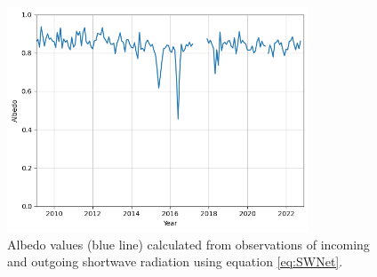 \documentclass{article}
\begin{document}
\begin{figure}[h!]
  \centering
  \includegraphics[width=0.8\textwidth]{figures/Albedo.png}
  \caption{Albedo values (blue line) calculated from observations of incoming and outgoing shortwave radiation using equation \eqref{eq:SWNet}.}
  \label{fig:Albedo}
\end{figure}
\end{document}
